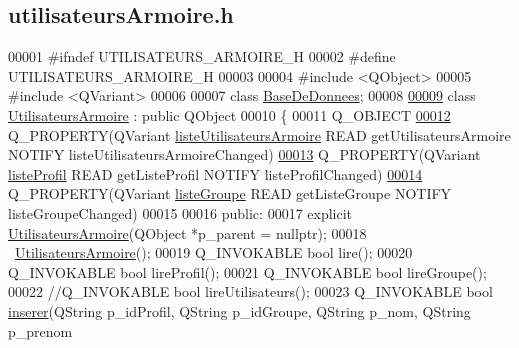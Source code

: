 \hypertarget{utilisateurs_armoire_8h_source}{}\subsection{utilisateurs\+Armoire.\+h}
\label{utilisateurs_armoire_8h_source}

\begin{DoxyCode}
00001 \textcolor{preprocessor}{#ifndef UTILISATEURS\_ARMOIRE\_H}
00002 \textcolor{preprocessor}{#define UTILISATEURS\_ARMOIRE\_H}
00003 
00004 \textcolor{preprocessor}{#include <QObject>}
00005 \textcolor{preprocessor}{#include <QVariant>}
00006 
00007 \textcolor{keyword}{class }\hyperlink{class_base_de_donnees}{BaseDeDonnees};
00008 
\hyperlink{class_utilisateurs_armoire}{00009} \textcolor{keyword}{class }\hyperlink{class_utilisateurs_armoire}{UtilisateursArmoire} : \textcolor{keyword}{public} QObject
00010 \{
00011     Q\_OBJECT
\hyperlink{class_utilisateurs_armoire_a8ba4ea6592f6588ab1cd0ddce7dc744d}{00012}     Q\_PROPERTY(QVariant \hyperlink{class_utilisateurs_armoire_a8ba4ea6592f6588ab1cd0ddce7dc744d}{listeUtilisateursArmoire} READ getUtilisateursArmoire NOTIFY
       listeUtilisateursArmoireChanged)
\hyperlink{class_utilisateurs_armoire_a377e5cc73178d05cdad23d8d84ae28a4}{00013}     Q\_PROPERTY(QVariant \hyperlink{class_utilisateurs_armoire_a377e5cc73178d05cdad23d8d84ae28a4}{listeProfil} READ getListeProfil NOTIFY listeProfilChanged)
\hyperlink{class_utilisateurs_armoire_a3012f6f272b32aa9a9cf6cc05dc129f5}{00014}     Q\_PROPERTY(QVariant \hyperlink{class_utilisateurs_armoire_a3012f6f272b32aa9a9cf6cc05dc129f5}{listeGroupe} READ getListeGroupe NOTIFY listeGroupeChanged)
00015 
00016 public:
00017     explicit \hyperlink{class_utilisateurs_armoire}{UtilisateursArmoire}(QObject *p\_parent = \textcolor{keywordtype}{nullptr});
00018     ~\hyperlink{class_utilisateurs_armoire}{UtilisateursArmoire}();
00019     Q\_INVOKABLE \textcolor{keywordtype}{bool} lire();
00020     Q\_INVOKABLE \textcolor{keywordtype}{bool} lireProfil();
00021     Q\_INVOKABLE \textcolor{keywordtype}{bool} lireGroupe();
00022     \textcolor{comment}{//Q\_INVOKABLE bool lireUtilisateurs();}
00023     Q\_INVOKABLE \textcolor{keywordtype}{bool} \hyperlink{class_utilisateurs_armoire_a773bfde7c49dac8fa2c8a1c9a43592c0}{inserer}(QString p\_idProfil, QString p\_idGroupe, QString p\_nom, QString p\_prenom

\end{DoxyCode}
